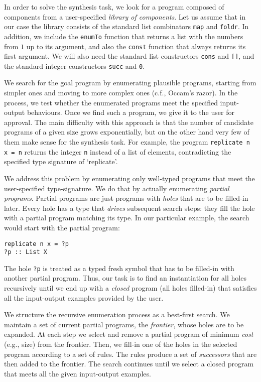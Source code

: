 In order to solve the synthesis task, we look for a program composed of components from a user-specified \emph{library of components}.  Let us assume that in our case the library consists of the standard list combinators \lstinline|map| and \lstinline|foldr|.  In addition, we include the \lstinline|enumTo| function that returns a list with the numbers from $1$ up to its argument, and also the \lstinline|const| function that always returns its first argument.  We will also need the standard list constructors \lstinline|cons| and \lstinline|[]|, and the standard integer constructors \lstinline|succ| and \lstinline|0|.

We search for the goal program by enumerating plausible programs, starting from simpler ones and moving to more complex ones (c.f., Occam's razor).  In the process, we test whether the enumerated programs meet the specified input-output behaviours.  Once we find such a program, we give it to the user for approval.  The main difficulty with this approach is that the number of candidate programs of a given size grows exponentially, but on the other hand very few of them make sense for the synthesis task.  For example, the program \lstinline|replicate n x = n| returns the integer \lstinline!n! instead of a list of elements, contradicting the specified type signature of `replicate'.

We address this problem by enumerating only well-typed programs that meet the user-specified type-signature.  We do that by actually enumerating \emph{partial programs}.  Partial programs are just programs with \emph{holes} that are to be filled-in later.  Every hole has a type that \emph{drives} subsequent search steps: they fill the hole with a partial program matching its type.  In our particular example, the search would start with the partial program:
\begin{lstlisting}[style=plain]
replicate n x = ?p
?p :: List X
\end{lstlisting}
The hole \lstinline|?p| is treated as a typed fresh symbol that has to be filled-in with another partial program.  Thus, our task is to find an instantiation for all holes recursively until we end up with a \emph{closed} program (all holes filled-in) that satisfies all the input-output examples provided by the user.

We structure the recursive enumeration process as a best-first search.  We maintain a set of current partial programs, the \emph{frontier}, whose holes are to be expanded.  At each step we select and remove a partial program of minimum \emph{cost} (e.g., size) from the frontier.  Then, we fill-in one of the holes in the selected program according to a set of rules.  The rules produce a set of \emph{successors} that are then added to the frontier.  The search continues until we select a closed program that meets all the given input-output examples.

